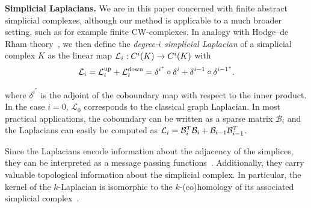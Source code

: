 \textbf{Simplicial Laplacians.} We are in this paper concerned with finite abstract simplicial complexes, although our method is applicable to a much broader setting, such as for example finite CW-complexes. 
In analogy with Hodge--de Rham theory~\cite{madsen1997calculus}, we then define the \emph{degree-$i$ simplicial Laplacian} of a simplicial complex $K$ as the linear map $\mathcal{L}_i:C^i(K)\to C^i(K)$ with
\begin{equation*}
  \mathcal{L}_i = \mathcal{L}^{\text{up}}_i + \mathcal{L}^{\text{down}}_i = \delta^{{i}^{\ast}}\circ\delta^{i} + \delta^{i-1}\circ\delta^{{i-1}^{\ast}}.
\end{equation*}

where $\delta^{{i}^{\ast}}$ is the adjoint of the coboundary map with respect to the inner product. In the case $i=0$, $\mathcal{L}_0$ corresponds to the classical graph Laplacian. In most practical applications, the coboundary can be written as a sparse matrix $\mathcal{B}_i$ and the Laplacians can easily be computed as $\mathcal{L}_i=\mathcal{B}_i^T\mathcal{B}_{i}+\mathcal{B}_{i-1}\mathcal{B}_{i-1}^T$. 

  Since the Laplacians encode information about the adjacency of the simplices, they can be interpreted as a message passing functions~\cite{gilmer2017NeuralMP}. Additionally, they carry valuable topological information about the simplicial complex. In particular, the kernel of the $k$-Laplacian is isomorphic to the $k$-(co)homology of its associated simplicial complex~\cite{eckmann1944,horak2013spectra}.
